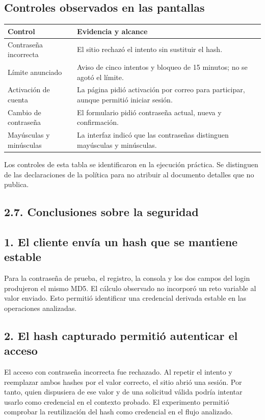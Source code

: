 \documentclass[11pt,letterpaper]{article}
\begin{document}
\subsection*{Controles observados en las pantallas}
{\small\renewcommand{\arraystretch}{1.12}
\begin{longtable}{|>{\raggedright\arraybackslash}p{4.31cm}|>{\raggedright\arraybackslash}p{11.26cm}|}
\hline
\textbf{Control} & \textbf{Evidencia y alcance}\\\hline
\endhead
Contraseña incorrecta & El sitio rechazó el intento sin sustituir el hash.\\\hline
Límite anunciado & Aviso de cinco intentos y bloqueo de 15 minutos; no se agotó el límite.\\\hline
Activación de cuenta & La página pidió activación por correo para participar, aunque permitió iniciar sesión.\\\hline
Cambio de contraseña & El formulario pidió contraseña actual, nueva y confirmación.\\\hline
Mayúsculas y minúsculas & La interfaz indicó que las contraseñas distinguen mayúsculas y minúsculas.\\\hline
\end{longtable}
}
Los controles de esta tabla se identificaron en la ejecución práctica. Se distinguen de las declaraciones de la política para no atribuir al documento detalles que no publica.\par
\newpage
\subsection*{2.7. Conclusiones sobre la seguridad}
\subsection*{1. El cliente envía un hash que se mantiene estable}
Para la contraseña de prueba, el registro, la consola y los dos campos del login produjeron el mismo MD5. El cálculo observado no incorporó un reto variable al valor enviado. Esto permitió identificar una credencial derivada estable en las operaciones analizadas.\par
\subsection*{2. El hash capturado permitió autenticar el acceso}
El acceso con contraseña incorrecta fue rechazado. Al repetir el intento y reemplazar ambos hashes por el valor correcto, el sitio abrió una sesión. Por tanto, quien dispusiera de ese valor y de una solicitud válida podría intentar usarlo como credencial en el contexto probado. El experimento permitió comprobar la reutilización del hash como credencial en el flujo analizado.\par
\end{document}
